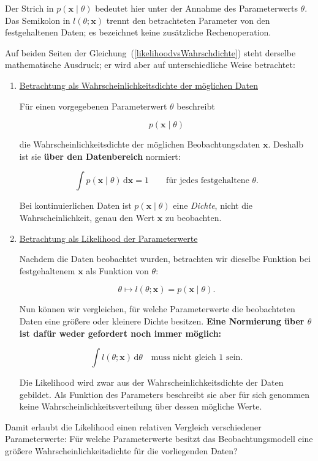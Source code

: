 Der Strich in $p(\mathbf x\mid\theta)$ bedeutet hier \glqq unter der Annahme des Parameterwerts $\theta$\grqq. Das Semikolon in $l(\theta;\mathbf x)$ trennt den betrachteten Parameter von den festgehaltenen Daten;
es bezeichnet keine zusätzliche Rechenoperation.

Auf beiden Seiten der Gleichung~(\ref{likelihoodvsWahrschdichte}) steht derselbe mathematische Ausdruck; er wird aber auf unterschiedliche Weise betrachtet:
\begin{enumerate}
\item \underline{Betrachtung als Wahrscheinlichkeitsdichte der möglichen Daten}

Für einen vorgegebenen Parameterwert $\theta$ beschreibt

\[
p(\mathbf x\mid\theta)
\]

die Wahrscheinlichkeitsdichte der möglichen Beobachtungsdaten $\mathbf x$. Deshalb ist sie \textbf{über den Datenbereich} normiert:

\[
\int p(\mathbf x\mid\theta)\,\mathrm d\mathbf x=1
\qquad\text{für jedes festgehaltene }\theta.
\]

Bei kontinuierlichen Daten ist $p(\mathbf x\mid\theta)$ eine \emph{Dichte}, nicht die Wahrscheinlichkeit, genau den Wert $\mathbf x$ zu beobachten.

\item \underline{Betrachtung als Likelihood der Parameterwerte}

Nachdem die Daten beobachtet wurden, betrachten wir dieselbe Funktion bei festgehaltenem $\mathbf x$ als Funktion von $\theta$:

\[
\theta\longmapsto l(\theta;\mathbf x)
=p(\mathbf x\mid\theta).
\]

Nun können wir vergleichen, für welche Parameterwerte die beobachteten Daten eine größere oder kleinere Dichte besitzen. \textbf{Eine Normierung über $\theta$ ist dafür weder gefordert noch immer möglich:}

\[
\int l(\theta;\mathbf x)\,\mathrm d\theta
\quad\text{muss nicht gleich }1\text{ sein.}
\]

Die Likelihood wird zwar aus der Wahrscheinlichkeitsdichte der Daten gebildet. Als Funktion des Parameters beschreibt sie aber für sich genommen keine Wahrscheinlichkeitsverteilung über dessen mögliche Werte.
\end{enumerate}

Damit erlaubt die Likelihood einen relativen Vergleich verschiedener
Parameterwerte: Für welche Parameterwerte besitzt das
Beobachtungsmodell eine größere Wahrscheinlichkeitsdichte für die
vorliegenden Daten?


